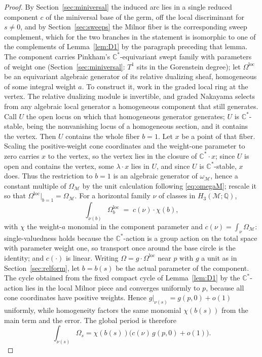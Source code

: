 \documentclass[11pt]{amsart}
\theoremstyle{definition}
\theoremstyle{remark}
\theoremstyle{plain}
\newcommand{\QQ}{\mathbb{Q}}
\newcommand{\CC}{\mathbb{C}}
\newcommand{\Mil}{\mathcal{M}}  %
\begin{document}
\begin{proof}
By Section~\ref{sec:miniversal} the induced arc lies in a single
reduced component $c$ of the miniversal base of the germ, off the
local discriminant for $s\neq0$, and by Section~\ref{sec:sweeps} the
Milnor fiber is the corresponding sweep complement, which for the two
branches in the statement is isomorphic to one of the complements of
Lemma~\ref{lem:D1} by the paragraph preceding that lemma.  The component carries Pinkham's
$\CC^*$-equivariant swept family with parameters of weight one
(Section~\ref{sec:miniversal}: $T^1$ sits in the Gorenstein degree);
let $\Omega^{\mathrm{loc}}$ be an equivariant algebraic generator of
its relative dualizing sheaf, homogeneous of some integral weight
$a$.  To construct it, work in the graded local ring at the vertex.
The relative dualizing module is invertible, and graded Nakayama
selects from any algebraic local generator a homogeneous component
that still generates.  Call $U$ the open locus on which that homogeneous
generator generates; $U$ is $\CC^*$-stable, being the nonvanishing locus of a
homogeneous section, and it contains the vertex.  Then $U$ contains the whole
fiber $b=1$.  Let $x$ be a point of that fiber.  Scaling the positive-weight
cone coordinates and the weight-one parameter to zero carries $x$ to the vertex,
so the vertex lies in the closure of $\CC^*\cdot x$; since $U$ is open and
contains the vertex, some $\lambda\cdot x$ lies in $U$, and since $U$ is
$\CC^*$-stable, $x$ does.  Thus the restriction to $b=1$ is an
algebraic
generator of $\omega_\Mil$, hence a constant multiple of $\Omega_\Mil$ by
the unit calculation following \eqref{eq:omegaM}; rescale it so that
$\Omega^{\mathrm{loc}}|_{b=1}=\Omega_\Mil$.
For a horizontal family $\nu$ of classes in $H_3(\Mil;\QQ)$,
\[
\int_{\nu(b)}\Omega^{\mathrm{loc}}_b\;=\;c(\nu)\cdot\chi(b),
\]
with $\chi$ the weight-$a$ monomial in the component parameter and
$c(\nu)=\int_\nu\Omega_\Mil$: single-valuedness holds because the
$\CC^*$-action is a group action on the total space with parameter
weight one, so transport once around the base circle is the identity;
and $c(\cdot)$ is linear.  Writing
$\Omega=g\cdot\Omega^{\mathrm{loc}}$ near $p$ with $g$ a unit as in
Section~\ref{sec:relform}, let $b=b(s)$ be the actual parameter of the
component.  The cycle obtained from the fixed compact cycle of
Lemma~\ref{lem:D1} by the $\CC^*$-action lies in the local Milnor
piece and converges uniformly to $p$, because all cone coordinates
have positive weights.  Hence $g|_{\nu(s)}=g(p,0)+o(1)$ uniformly,
while homogeneity factors the same monomial $\chi(b(s))$ from the main
term and the error.  The global period is therefore
\[
\int_{\nu(s)}\Omega_s
=\chi(b(s))\bigl(c(\nu)\,g(p,0)+o(1)\bigr).
\]


\end{proof}
\end{document}
